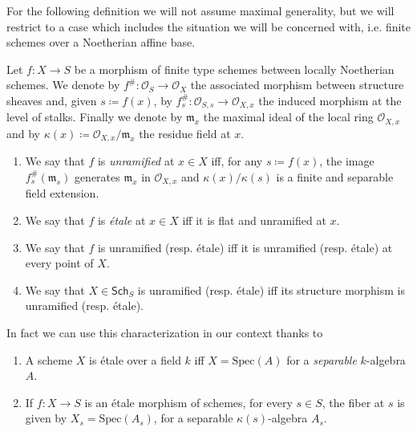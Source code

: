 \documentclass[../Main]{subfiles}
\begin{document}
For the following definition we will not assume maximal generality, but
we will restrict to a case which includes the situation we will be concerned with,
i.e. finite schemes over a Noetherian affine base.
\begin{defn}\label{defn:EtaleMorphismSheaves}
	Let $f\colon X \to S$ be a morphism of finite type schemes between
	locally Noetherian schemes.
	We denote by $f^{\#}\colon \mathcal{O}_{ S } \to \mathcal{O}_{ X }$ the
	associated morphism between structure sheaves and, given $s \coloneqq f(x)$,
	by $f_s^{\#}\colon \mathcal{O}_{ S,s } \to \mathcal{O}_{ X,x }$ the induced morphism
	at the level of stalks.
	Finally we denote by $\mathfrak{m}_x$ the maximal ideal of the local ring
	$\mathcal{O}_{ X,x }$ and by $\kappa(x) \coloneqq \mathcal{O}_{ X,x }/\mathfrak{m}_x$
	the residue field at $x$.
\begin{enumerate}
	\item We say that $f$ is {\em unramified} at $x \in X$ iff, for any $s \coloneqq f(x)$,
		the image $f^{\#}_s(\mathfrak{m}_s)$ generates
		$\mathfrak{m}_x$ in $\mathcal{O}_{ X,x }$
		and $\kappa(x)/\kappa(s)$ is a finite and separable field extension.

	\item We say that $f$ is {\em étale} at $x \in X$ iff it is
		flat and unramified at $x$.

	\item We say that $f$ is unramified (resp$.$ étale) iff it is 
		unramified (resp$.$ étale) at every point of $X$.

	\item We say that $X \in \mathsf{Sch}_{ S }$ is unramified 
		(resp$.$ étale) iff its structure
		morphism is unramified (resp$.$ étale).
\end{enumerate}
\end{defn}


In fact we can use this characterization in our context thanks to
\begin{lem}
	\leavevmode\vspace{-.2\baselineskip}
\begin{enumerate}
	\item A scheme $X$ is étale over a field $k$ iff $X = \mathrm{Spec}(A)$
		for a {\em separable} $k$-algebra $A$.
	\item If $f\colon X \to S$ is an étale morphism of schemes,
		for every $s \in S$, the fiber at $s$ is given by $X_s = \mathrm{Spec}(A_s)$,
		for a separable $\kappa(s)$-algebra $A_s$.
\end{enumerate}
\end{lem} 
\end{document}
